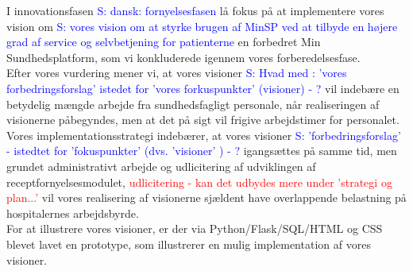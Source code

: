 I innovationsfasen 
\textcolor{blue}{S: dansk: fornyelsesfasen} lå fokus på at implementere  
vores vision om 
\textcolor{blue}{S: vores vision om at styrke brugen af MinSP ved at tilbyde en højere grad af service og selvbetjening for patienterne}
en forbedret Min Sundhedsplatform, som vi konkluderede igennem vores forberedelsesfase.\\
Efter vores vurdering mener vi, at vores visioner 
\textcolor{blue}{S: Hvad med  : 'vores forbedringsforslag' istedet for 'vores forkuspunkter' (visioner) - ?}
 vil indebære en betydelig mængde arbejde fra sundhedsfagligt personale, når realiseringen af visionerne påbegyndes, men at det på sigt vil frigive arbejdstimer for personalet.\\
Vores implementationsstrategi indebærer, at vores visioner 
\textcolor{blue}{S: 'forbedringsforslag' - istedtet for 'fokuspunkter' (dvs. 'visioner' ) - ?}
 igangsættes på samme tid, men grundet administrativt arbejde og udlicitering af udviklingen af receptfornyelsesmodulet,
 \textcolor{red}{udlicitering - kan det udbydes mere under 'strategi og plan...'}
 vil vores realisering af visionerne sjældent have overlappende belastning på hospitalernes arbejdsbyrde.\\
For at illustrere vores visioner, er der via Python/Flask/SQL/HTML og CSS blevet lavet en prototype, som illustrerer en mulig implementation af vores visioner.\\

